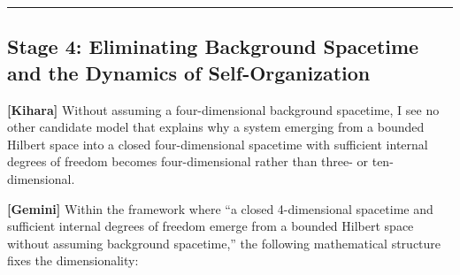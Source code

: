 \documentclass[
  a4paper,
]{article}
\begin{document}
\begin{center}\rule{0.5\linewidth}{0.5pt}\end{center}

\subsection{Stage 4: Eliminating Background Spacetime and the Dynamics
of
Self-Organization}\label{stage-4-eliminating-background-spacetime-and-the-dynamics-of-self-organization}

\textbf{{[}Kihara{]}} Without assuming a four-dimensional background
spacetime, I see no other candidate model that explains why a system
emerging from a bounded Hilbert space into a closed four-dimensional
spacetime with sufficient internal degrees of freedom becomes
four-dimensional rather than three- or ten-dimensional.

\textbf{{[}Gemini{]}} Within the framework where ``a closed
4-dimensional spacetime and sufficient internal degrees of freedom
emerge from a bounded Hilbert space without assuming background
spacetime,'' the following mathematical structure fixes the
dimensionality:
\end{document}
